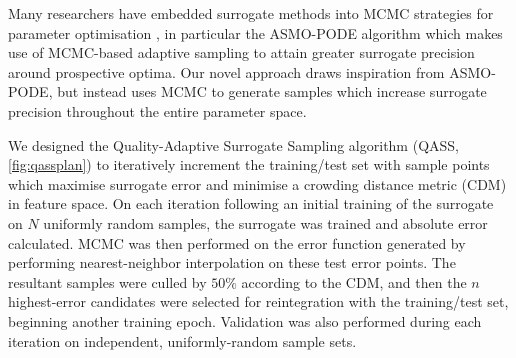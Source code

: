 
Many researchers have embedded surrogate methods into MCMC strategies for
parameter optimisation \cite{Zhang2020,Gong2017}, in particular the ASMO-PODE
algorithm \cite{Ginting2011} which makes use of MCMC-based adaptive sampling to
attain greater surrogate precision around prospective optima. Our novel approach
draws inspiration from ASMO-PODE, but instead uses MCMC to generate samples
which increase surrogate precision throughout the entire parameter space.


We designed the Quality-Adaptive Surrogate Sampling algorithm (QASS,
\cref{fig:qassplan}) to iteratively increment the training/test set with sample
points which maximise surrogate error and minimise a crowding distance metric
(CDM) \cite{Solonen2012} in feature space. On each iteration following an initial training of the surrogate on $N$ uniformly random samples, the surrogate was trained and absolute error calculated. MCMC was then performed on the error function generated by performing nearest-neighbor interpolation on these test error points. The resultant samples were culled by $50\%$ according to the CDM, and then the $n$ highest-error candidates were selected for reintegration with the training/test set, beginning another training epoch. Validation was also performed during each iteration on independent, uniformly-random sample sets.




